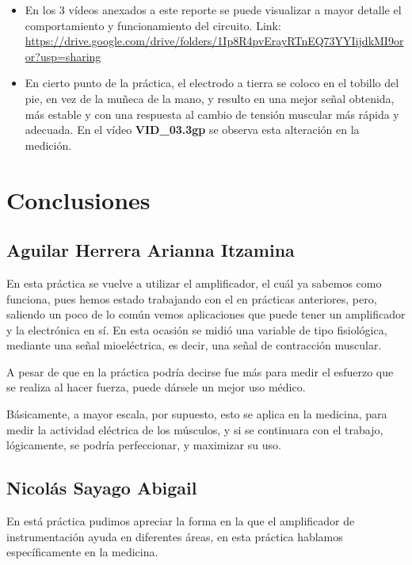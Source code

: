 \documentclass[12pt]{article}
\begin{document}
\begin{itemize}
            \item[\checkmark] En los 3 vídeos anexados a este reporte se puede visualizar a mayor detalle el \\ comportamiento y funcionamiento del circuito. Link: \url{https://drive.google.com/drive/folders/1Ip8R4pvErayRTnEQ73YYIijdkMI9oror?usp=sharing}
            \item[\checkmark] En cierto punto de la práctica, el electrodo a tierra se coloco en el tobillo del pie, en vez de la muñeca de la mano, y resulto en una mejor señal obtenida, más estable y con una respuesta al cambio de tensión muscular más rápida y adecuada. En el vídeo \textbf{VID\_03.3gp} se observa esta alteración en la medición.
    \end{itemize} 

	\newpage
	\section{Conclusiones}
	    \subsection{Aguilar Herrera Arianna Itzamina}
	    En esta práctica se vuelve a utilizar el amplificador, el cuál ya sabemos como funciona, pues hemos estado trabajando con el en prácticas anteriores, pero, saliendo un poco de lo común vemos aplicaciones que puede tener un amplificador y la electrónica en sí. En esta ocasión se midió una variable de tipo fisiológica, mediante una señal mioeléctrica, es decir, una señal de contracción muscular.
	    
	    A pesar de que en la práctica podría decirse fue más para medir el esfuerzo que se realiza al hacer fuerza, puede dársele un mejor uso médico.
	    
	    Básicamente, a mayor escala, por supuesto, esto se aplica en la medicina, para medir la actividad eléctrica de los músculos, y si se continuara con el trabajo, lógicamente, se podría perfeccionar, y maximizar su uso. 
	    
	    \subsection{Nicolás Sayago Abigail}
	    En está práctica pudimos apreciar la forma en la que el amplificador de instrumentación ayuda en diferentes áreas, en esta práctica hablamos específicamente en la medicina.
	    
\end{document}
